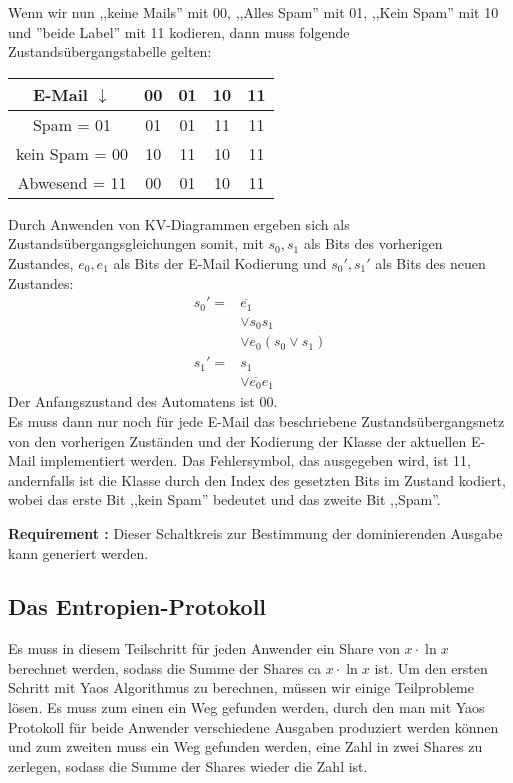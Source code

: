 \documentclass{article}
\newcounter{requirementscount}{}
\newcommand{\requirement}[1] {
        \addtocounter{requirementscount}{1}
        {\bf Requirement \therequirementscount:} #1\\
    }
\begin{document}
Wenn wir nun ,,keine Mails'' mit 00, ,,Alles Spam'' mit 01,
,,Kein Spam'' mit 10 und ''beide Label'' mit 11 kodieren, dann muss folgende
Zustands\"ubergangstabelle gelten:\\
\begin{center}
\begin{tabular}{c|c c c c}
E-Mail \(\downarrow\) & 00 & 01 & 10 & 11\\
\hline
Spam = 01 & 01 & 01 & 11 & 11\\
kein Spam = 00 & 10 & 11 & 10 & 11\\
Abwesend = 11 & 00 & 01 & 10 & 11
\end{tabular}
\end{center}

Durch Anwenden von KV-Diagrammen ergeben sich als Zustands\"ubergangsgleichungen
somit, mit \(s_0, s_1\) als Bits des vorherigen Zustandes, \(e_0, e_1\) als Bits
der E-Mail Kodierung und \(s_0', s_1'\) als Bits des neuen Zustandes:
\begin{align*}
s_0'  =& \overline{e_1} \\
       & \vee s_0 s_1\\
       & \vee e_0(s_0 \vee s_1)\\
s_1'  =& s_1 \\
       & \vee \overline{e_0} e_1
\end{align*}
Der Anfangszustand des Automatens ist 00.\\
Es muss dann nur noch f\"ur jede E-Mail das beschriebene Zustands\"ubergangsnetz
von den vorherigen Zust\"anden und der Kodierung der Klasse der aktuellen
E-Mail implementiert werden. Das Fehlersymbol, das ausgegeben wird, ist 11,
andernfalls ist die Klasse durch den Index des gesetzten Bits im Zustand kodiert,
wobei das erste Bit ,,kein Spam'' bedeutet und das zweite Bit ,,Spam''. \\
\requirement{Dieser Schaltkreis zur Bestimmung der dominierenden Ausgabe kann
generiert werden.}

\subsection{Das Entropien-Protokoll}
Es muss in diesem Teilschritt f\"ur jeden Anwender ein Share von
 \(x\cdot \ln x\) berechnet werden, sodass die Summe der Shares
 ca \(x \cdot \ln x\) ist.
Um den ersten Schritt mit Yaos Algorithmus zu berechnen, m\"ussen
wir einige Teilprobleme l\"osen. Es muss zum einen ein Weg gefunden
werden, durch den man mit Yaos Protokoll f\"ur beide Anwender
verschiedene Ausgaben produziert werden k\"onnen und zum zweiten muss
ein Weg gefunden werden, eine Zahl in zwei Shares zu zerlegen, sodass die
Summe der Shares wieder die Zahl ist.
\end{document}
